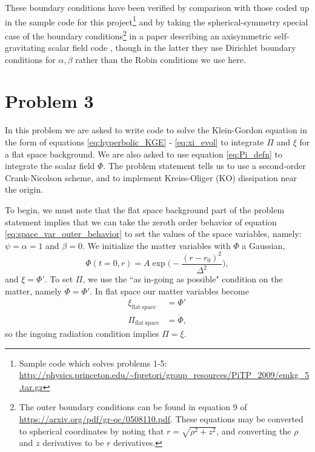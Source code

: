 \documentclass[12pt]{article}
\numberwithin{equation}{section}
\begin{document}
These boundary conditions have been verified by comparison with those coded up in the sample code for this project\footnote{Sample code which solves problems 1-5: \url{http://physics.princeton.edu/~fpretori/group_resources/PiTP_2009/emkg_5.tar.gz}} and by taking the spherical-symmetry special case of the boundary conditions\footnote{The outer boundary conditions can be found in equation 9 of \url{https://arxiv.org/pdf/gr-qc/0508110.pdf}.  These equations may be converted to spherical coordinates by noting that $r = \sqrt{\rho^2 + z^2}$, and converting the $\rho$ and $z$ derivatives to be $r$ derivatives.} in a paper describing an axisymmetric self-gravitating scalar field code \cite{Pretorius06}, though in the latter they use Dirichlet boundary conditions for $\alpha, \beta$ rather than the Robin conditions we use here.

\section{Problem 3}
In this problem we are asked to write code to solve the Klein-Gordon equation in the form of equations \ref{eq:hyperbolic_KGE} - \ref{eq:xi_evol} to integrate $\Pi$ and $\xi$ for a flat space background.  We are also asked to use equation \ref{eq:Pi_defn} to integrate the scalar field $\Phi$.  The problem statement tells us to use a second-order Crank-Nicolson scheme, and to implement Kreiss-Oliger (KO) dissipation near the origin.

To begin, we must note that the flat space background part of the problem statement implies that we can take the zeroth order behavior of equation \ref{eq:space_var_outer_behavior} to set the values of the space variables, namely: $\psi = \alpha = 1$ and $\beta = 0$.  We initialize the matter variables with $\Phi$ a Gaussian, 
\begin{equation}
\Phi(t=0, r) = A \exp \Big( -\frac{(r-r_0)^2}{\Delta^2} \Big),
\end{equation}
and $\xi = \Phi'$.  To set $\Pi$, we use the ``as in-going as possible" condition on the matter, namely $\dot{\Phi} = \Phi'$.  In flat space our matter variables become
\begin{equation*}
\begin{aligned}
\xi_{\mathrm{flat~space}} &= \Phi' \\
\Pi_{\mathrm{flat~space}} &= \dot{\Phi},
\end{aligned}
\end{equation*}
so the ingoing radiation condition implies $\Pi = \xi$.
\end{document}

